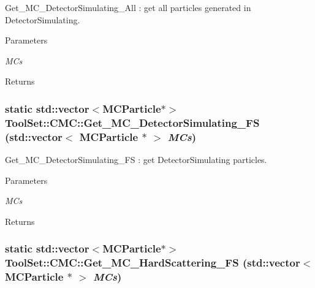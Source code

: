 Get\_\-MC\_\-DetectorSimulating\_\-All : get all particles generated in DetectorSimulating. 
\begin{DoxyParams}{Parameters}
\item[{\em MCs}]\end{DoxyParams}
\begin{DoxyReturn}{Returns}

\end{DoxyReturn}
\hypertarget{classToolSet_1_1CMC_af0a81c6e40cc44cecfe9947be99783d4}{
\subsubsection[{Get\_\-MC\_\-DetectorSimulating\_\-FS}]{\setlength{\rightskip}{0pt plus 5cm}static std::vector$<$MCParticle$\ast$$>$ ToolSet::CMC::Get\_\-MC\_\-DetectorSimulating\_\-FS (std::vector$<$ MCParticle $\ast$ $>$ {\em MCs})}}
\label{classToolSet_1_1CMC_af0a81c6e40cc44cecfe9947be99783d4}


Get\_\-MC\_\-DetectorSimulating\_\-FS : get DetectorSimulating particles. 
\begin{DoxyParams}{Parameters}
\item[{\em MCs}]\end{DoxyParams}
\begin{DoxyReturn}{Returns}

\end{DoxyReturn}
\hypertarget{classToolSet_1_1CMC_a899d324f086d12abb75db9d87798ed91}{
\subsubsection[{Get\_\-MC\_\-HardScattering\_\-FS}]{\setlength{\rightskip}{0pt plus 5cm}static std::vector$<$MCParticle$\ast$$>$ ToolSet::CMC::Get\_\-MC\_\-HardScattering\_\-FS (std::vector$<$ MCParticle $\ast$ $>$ {\em MCs})}}
\label{classToolSet_1_1CMC_a899d324f086d12abb75db9d87798ed91}


